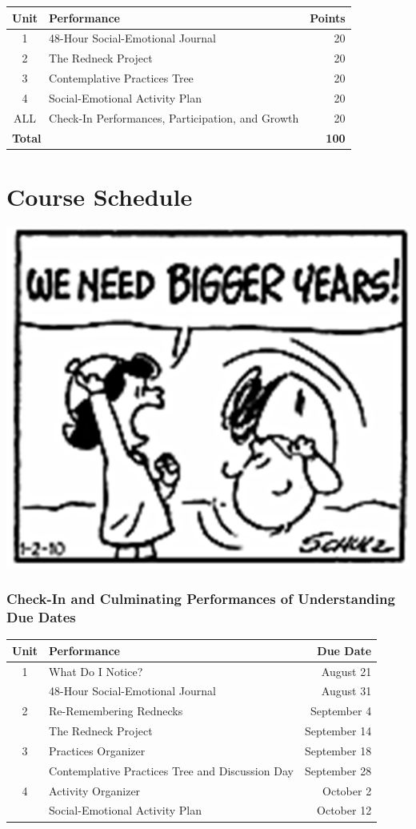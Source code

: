\documentclass[two-side]{tufte-handout}
\begin{document}
\bigskip

\begin{tabular}{clr}
	\toprule
	Unit & Performance & Points \\
	\midrule\midrule
	1 & 48-Hour Social-Emotional Journal & 20 \\
	\midrule
	2 & The Redneck Project & 20 \\
	\midrule
	3 & Contemplative Practices Tree & 20 \\
	\midrule
	4 & Social-Emotional Activity Plan & 20 \\
	\midrule
	ALL & Check-In Performances, Participation, and Growth & 20 \\
	\midrule\midrule
	\multicolumn{2}{l}{\textbf{Total}} & \textbf{100} \\
	\bottomrule
\end{tabular}

\newpage

\part{\faCalendar\medspace Course Schedule \medspace\faCalendar}

\begin{marginfigure}
	\begin{center}
		\includegraphics[width=0.4\linewidth]{sc-pic.png}
	\end{center}
\end{marginfigure}

\medskip

\section{Check-In and Culminating Performances of Understanding Due Dates}
\begin{tabular}{clr}
	\toprule
	Unit & Performance & Due Date \\
	\midrule\midrule
	1 & What Do I Notice? & August 21 \\
	& 48-Hour Social-Emotional Journal & August 31 \\
	\midrule
	2 & Re-Remembering Rednecks & September 4 \\
	& The Redneck Project & September 14 \\
	\midrule
	3 & Practices Organizer & September 18 \\
	& Contemplative Practices Tree and Discussion Day & September 28 \\
	\midrule
	4 & Activity Organizer & October 2 \\
	& Social-Emotional Activity Plan & October 12 \\
	\bottomrule
\end{tabular}
\end{document}
